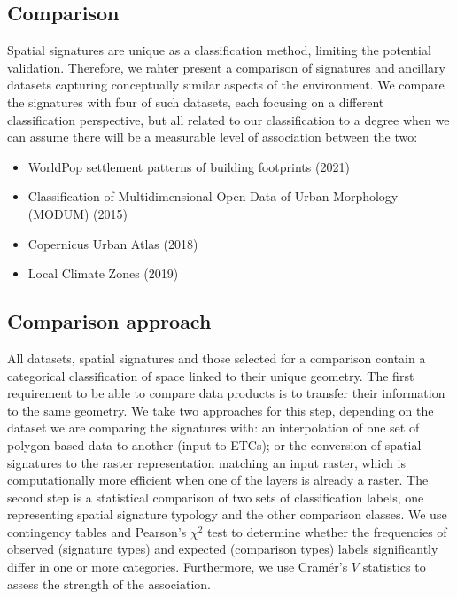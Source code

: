 \subsection*{Comparison}

Spatial signatures are unique as a classification method, limiting the potential
validation. Therefore, we rahter present a comparison of signatures and ancillary datasets capturing
conceptually similar aspects of the environment. We compare the signatures with four of
such datasets, each focusing on a different classification perspective, but all related
to our classification to a degree when we can assume there will be a measurable level of
association between the two:

\begin{itemize}
    \item WorldPop settlement patterns of building footprints (2021)\cite{jochem2021tools}
    \item Classification of Multidimensional Open Data of Urban Morphology (MODUM) (2015)\cite{alexiou2016}
    \item Copernicus Urban Atlas (2018)\cite{eea2018}
    \item Local Climate Zones (2019)\cite{demuzere2019mapping}
\end{itemize}


\subsection*{Comparison approach}
All datasets, spatial signatures and those selected for a comparison contain a
categorical classification of space linked to their unique geometry. The first
requirement to be able to compare data products is to transfer their
information to the same geometry. We take two approaches for this step,
depending on the dataset we are comparing the signatures with:
an interpolation of one set of polygon-based data to another (input to ETCs);
or the conversion of
spatial signatures to the raster representation matching an input raster,
which is computationally more efficient when one of the layers is already a raster. The second
step is a statistical comparison of two sets of classification labels, one representing
spatial signature typology and the other comparison classes. We use contingency tables
and Pearson's $\chi^{2}$ test to determine whether the frequencies of observed
(signature types) and expected (comparison types) labels significantly differ in one or
more categories. Furthermore, we use Cramér's $V$ statistics\cite{cramer2016mathematical} to assess the strength of
the association.

